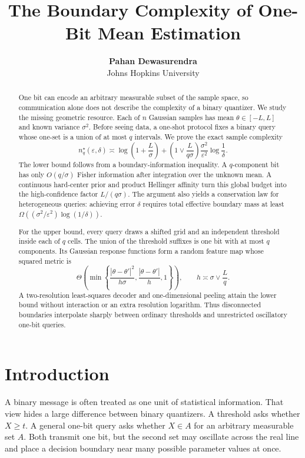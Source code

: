 \documentclass{article}
\title{The Boundary Complexity of One-Bit Mean Estimation}
\author{\textbf{Pahan Dewasurendra} \\ Johns Hopkins University}
\theoremstyle{definition}
\theoremstyle{remark}
\newcommand{\1}{\mathbf 1}
\begin{document}
\maketitle

\begin{abstract}
One bit can encode an arbitrary measurable subset of the sample space, so communication alone does not describe the complexity of a binary quantizer. We study the missing geometric resource. Each of \(n\) Gaussian samples has mean \(\theta\in[-L,L]\) and known variance \(\sigma^2\). Before seeing data, a one-shot protocol fixes a binary query whose one-set is a union of at most \(q\) intervals. We prove the exact sample complexity \[ n_q^\star(\varepsilon,\delta) \asymp \log\!\left(1+\frac{L}{\sigma}\right) + \left(1\vee\frac{L}{q\sigma}\right) \frac{\sigma^2}{\varepsilon^2}\log\frac1\delta . \] The lower bound follows from a boundary-information inequality. A \(q\)-component bit has only \(O(q/\sigma)\) Fisher information after integration over the unknown mean. A continuous hard-center prior and product Hellinger affinity turn this global budget into the high-confidence factor \(L/(q\sigma)\). The argument also yields a conservation law for heterogeneous queries: achieving error \(\delta\) requires total effective boundary mass at least \(\Omega((\sigma^2/\varepsilon^2)\log(1/\delta))\).

For the upper bound, every query draws a shifted grid and an independent threshold inside each of \(q\) cells. The union of the threshold suffixes is one bit with at most \(q\) components. Its Gaussian response functions form a random feature map whose squared metric is \[ \Theta\!\left(\min\left\{\frac{|\theta-\theta'|^2}{h\sigma}, \frac{|\theta-\theta'|}{h},1\right\}\right), \qquad h\asymp \sigma\vee\frac{L}{q}. \] A two-resolution least-squares decoder and one-dimensional peeling attain the lower bound without interaction or an extra resolution logarithm. Thus disconnected boundaries interpolate sharply between ordinary thresholds and unrestricted oscillatory one-bit queries.
\end{abstract}

\section{Introduction}

A binary message is often treated as one unit of statistical information. That view hides a large difference between binary quantizers. A threshold asks whether \(X\geq t\). A general one-bit query asks whether \(X\in A\) for an arbitrary measurable set \(A\). Both transmit one bit, but the second set may oscillate across the real line and place a decision boundary near many possible parameter values at once.
\end{document}
